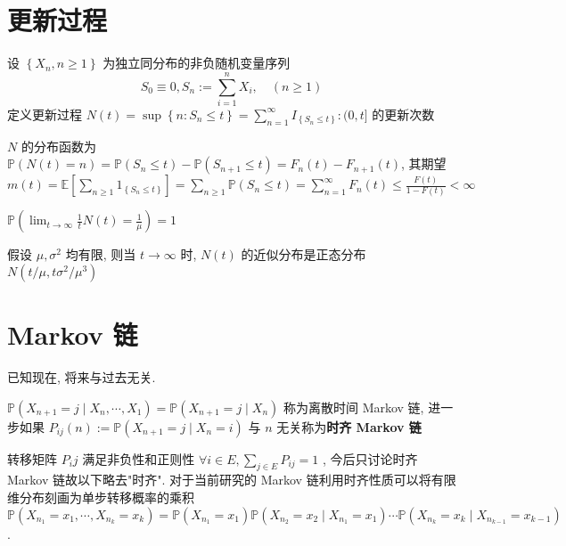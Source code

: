 \documentclass[10pt]{yerbaformat}
\begin{document}
\section{更新过程}
\begin{definition}
    设 $\left\{X_{n}, n \geq 1\right\}$ 为独立同分布的非负随机变量序列
    $$
        S_{0} \equiv 0, S_{n}:=\sum_{i=1}^{n} X_{i}, \quad(n \geq 1)
    $$
    定义更新过程 $N(t)=\sup \left\{n: S_{n} \leq t\right\}=\sum_{n=1}^{\infty} I_{\left\{S_{n} \leq t\right\}}:(0, t]$ 的更新次数
\end{definition}

\par $N$ 的分布函数为 $\mathbb{P}(N(t)=n)=\mathbb{P}\left(S_{n} \leq t\right)-\mathbb{P}\left(S_{n+1} \leq t\right)=F_{n}(t)-F_{n+1}(t)$, 其期望 $m(t)=\mathbb{E}\left[\sum_{n \geq 1} 1_{\left\{S_{n} \leq t\right\}}\right]=\sum_{n \geq 1} \mathbb{P}\left(S_{n} \leq t\right)=\sum_{n=1}^{\infty} F_{n}(t)\leq \frac{F(t)}{1-F(t)}<\infty$

\begin{theorem}
    $\mathbb{P}\left(\lim _{t \rightarrow \infty} \frac{1}{t} N(t)=\frac{1}{\mu}\right)=1$
\end{theorem}

\begin{theorem}
    假设 $\mu, \sigma^{2}$ 均有限, 则当 $t \rightarrow \infty$ 时, $N(t)$ 的近似分布是正态分布 $ N\left(t / \mu, t \sigma^{2} / \mu^{3}\right) $
\end{theorem}

\section{Markov 链}

\begin{definition}[无后效性]
    已知现在, 将来与过去无关.
\end{definition}

\begin{definition}
    $\mathbb{P}\left(X_{n+1}=j \mid X_{n}, \cdots, X_{1}\right)=\mathbb{P}\left(X_{n+1}=j \mid X_{n}\right)$ 称为离散时间 Markov 链, 进一步如果 $P_{i j}(n):=\mathbb{P}\left(X_{n+1}=j \mid X_{n}=i\right)$ 与 $n$ 无关称为\textbf{时齐 Markov 链}
\end{definition}

\par 转移矩阵 $P_ij$ 满足非负性和正则性 $\forall i \in E, \sum_{j \in E} P_{i j}=1$ , 今后只讨论时齐 Markov 链故以下略去"时齐". 对于当前研究的 Markov 链利用时齐性质可以将有限维分布刻画为单步转移概率的乘积 $$\mathbb{P}\left(X_{n_{1}}=x_{1}, \cdots, X_{n_{k}}=x_{k}\right)=\mathbb{P}\left(X_{n_{1}}=x_{1}\right) \mathbb{P}\left(X_{n_{2}}=x_{2} \mid X_{n_{1}}=x_{1}\right) \cdots \mathbb{P}\left(X_{n_{k}}=x_{k} \mid X_{n_{k-1}}=x_{k-1}\right)$$.
\end{document}
